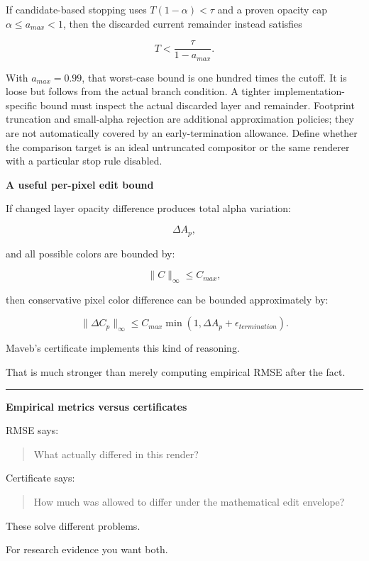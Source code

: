 If candidate-based stopping uses \(T(1-\alpha)<\tau\) and a proven opacity cap \(\alpha\le a_{max}<1\), then the discarded current remainder instead satisfies

\[
T<\frac{\tau}{1-a_{max}}.
\]

With \(a_{max}=0.99\), that worst-case bound is one hundred times the cutoff. It is loose but follows from the actual branch condition. A tighter implementation-specific bound must inspect the actual discarded layer and remainder. Footprint truncation and small-alpha rejection are additional approximation policies; they are not automatically covered by an early-termination allowance. Define whether the comparison target is an ideal untruncated compositor or the same renderer with a particular stop rule disabled.

\textbf{A useful per-pixel edit bound}

If changed layer opacity difference produces total alpha variation:

\[
\Delta A_p,
\]

and all possible colors are bounded by:

\[
\|C\|_\infty
\le
C_{max},
\]

then conservative pixel color difference can be bounded approximately by:

\[
\boxed{
\|\Delta C_p\|_\infty
\le
C_{max}
\min(
1,
\Delta A_p+\epsilon_{termination}
).
}
\]

Maveb's certificate implements this kind of reasoning.

That is much stronger than merely computing empirical RMSE after the fact.

\begin{center}\rule{0.5\linewidth}{0.5pt}\end{center}

\textbf{Empirical metrics versus certificates}

RMSE says:

\begin{quote}
What actually differed in this render?
\end{quote}

Certificate says:

\begin{quote}
How much was allowed to differ under the mathematical edit envelope?
\end{quote}

These solve different problems.

For research evidence you want both.

